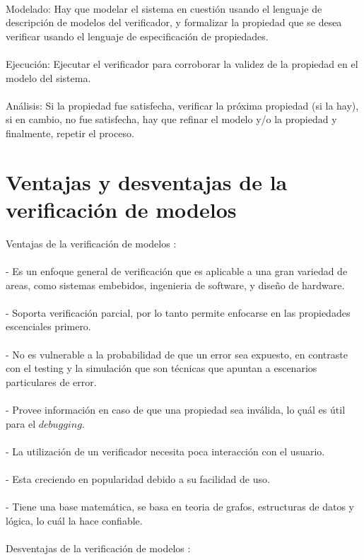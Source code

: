 \\
Modelado: Hay que modelar el sistema en cuestión usando el lenguaje de descripción de modelos del verificador, y formalizar la propiedad que se desea verificar usando el lenguaje de especificación de propiedades.\\
\\
Ejecución: Ejecutar el verificador para corroborar la validez de la propiedad en el modelo del sistema.\\
\\
Análisis: Si la propiedad fue satisfecha, verificar la próxima propiedad (si la hay), si en cambio, no fue satisfecha, hay que refinar el modelo y/o la propiedad y finalmente, repetir el proceso.\\

\section{Ventajas y desventajas de la verificación de modelos}
Ventajas de la verificación de modelos \cite{Baier:2}:\\
\\
- Es un enfoque general de verificación que es aplicable a una gran variedad de areas, como sistemas embebidos, ingenieria de software, y diseño de hardware.\\
\\
- Soporta verificación parcial, por lo tanto permite enfocarse en las propiedades escenciales primero.\\
\\
- No es vulnerable a la probabilidad de que un error sea expuesto, en contraste con el testing y la simulación que son técnicas que apuntan a escenarios particulares de error.\\
\\
- Provee información en caso de que una propiedad sea inválida, lo çuál es útil para el $debugging$.\\
\\
- La utilización de un verificador necesita poca interacción con el usuario.\\
\\
- Esta creciendo en popularidad debido a su facilidad de uso.\\
\\
- Tiene una base matemática, se basa en teoria de grafos, estructuras de datos y lógica, lo cuál la hace confiable.\\
\\
Desventajas de la verificación de modelos \cite{Baier:2}:\\
